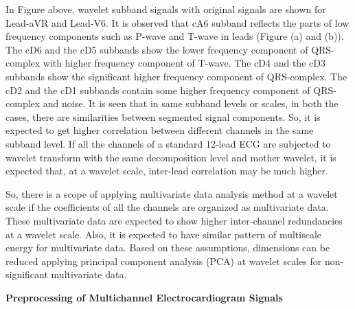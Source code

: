 In Figure above, wavelet subband signals with original signals are
shown for Lead-aVR and Lead-V6. It is observed that cA6 subband
reflects the parts of low frequency components such as P-wave and
T-wave in leads (Figure (a) and (b)). The cD6 and the cD5 subbands
show the lower frequency component of QRS-complex with higher
frequency component of T-wave. The cD4 and the cD3 subbands show
the significant higher frequency component of QRS-complex. The cD2
and the cD1 subbands contain some higher frequency component of
QRS-complex and noise. It is seen that in same subband levels or
scales, in both the cases, there are similarities between
segmented signal components. So, it is expected to get higher
correlation between different channels in the same subband level.
If all the channels of a standard 12-lead ECG are subjected to
wavelet transform with the same decomposition level and mother
wavelet, it is expected that, at a wavelet scale, inter-lead
correlation may be much higher.

So, there is a scope of applying multivariate data analysis method
at a wavelet scale if the coefficients of all the channels are
organized as multivariate data. These multivariate data are
expected to show higher inter-channel redundancies at a wavelet
scale. Also, it is expected to have similar pattern of multiscale
energy for multivariate data. Based on these assumptions,
dimensions can be reduced applying principal component analysis
(PCA) at wavelet scales for non-significant multivariate data.

\vspace{0.3in} \noindent \textbf{\Large{Preprocessing of
Multichannel Electrocardiogram Signals}} \label{preprocess-MECG}
\vspace{0.2in}

